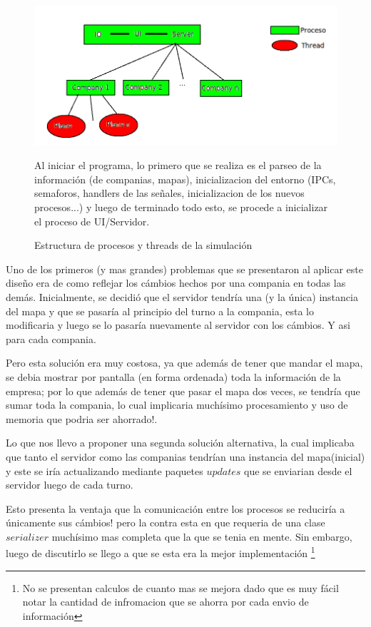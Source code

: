 \documentclass[a4paper,12pt,spanish]{article} %
\begin{document}
\begin{figure}[H]
\hspace{1cm}\includegraphics[scale=0.5]{imagenes/design.png}

\caption{Estructura de procesos y threads de la simulación}


Al iniciar el programa, lo primero que se realiza es el parseo de
la información (de companias, mapas), inicializacion del entorno (IPCs,
semaforos, handlers de las señales, inicializacion de los nuevos procesos...)
y luego de terminado todo esto, se procede a inicializar el proceso
de UI/Servidor.
\end{figure}


Uno de los primeros (y mas grandes) problemas que se presentaron al
aplicar este diseño era de como reflejar los cámbios hechos por una
compania en todas las demás. Inicialmente, se decidió que el servidor
tendría una (y la única) instancia del mapa y que se pasaría al principio
del turno a la compania, esta lo modificaria y luego se lo pasaría
nuevamente al servidor con los cámbios. Y asi para cada compania. 

Pero esta solución era muy costosa, ya que además de tener que mandar
el mapa, se debia mostrar por pantalla (en forma ordenada) toda la
información de la empresa; por lo que además de tener que pasar el
mapa dos veces, se tendría que sumar toda la compania, lo cual implicaria
muchísimo procesamiento y uso de memoria que podria ser ahorrado!.

Lo que nos llevo a proponer una segunda solución alternativa, la cual
implicaba que tanto el servidor como las companias tendrían una instancia
del mapa(inicial) y este se iría actualizando mediante paquetes $updates$
que se enviarian desde el servidor luego de cada turno. 

Esto presenta la ventaja que la comunicación entre los procesos se
reduciría a únicamente sus cámbios! pero la contra esta en que requeria
de una clase $serializer$ muchísimo mas completa que la que se tenia
en mente. Sin embargo, luego de discutirlo se llego a que se esta
era la mejor implementación %
\footnote{No se presentan calculos de cuanto mas se mejora dado que es muy fácil
notar la cantidad de infromacion que se ahorra por cada envio de información%
}\\
\end{document}
